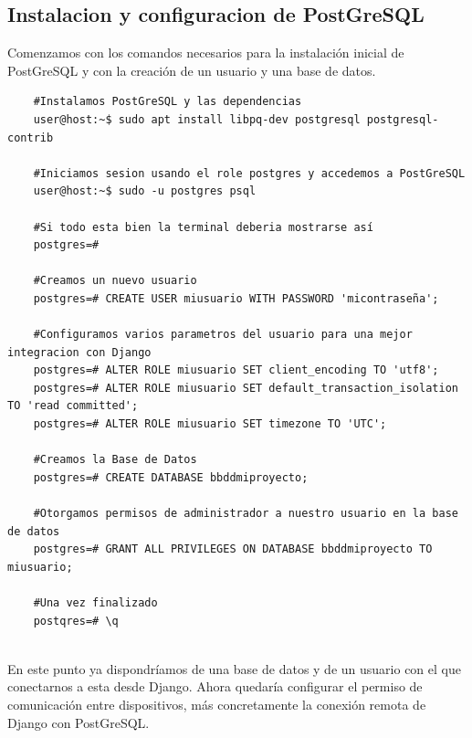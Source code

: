 \subsection{Instalacion y configuracion de PostGreSQL}
Comenzamos con los comandos necesarios para la instalación inicial de PostGreSQL y con la creación de un usuario y una base de datos.
\begin{verbatim}
	#Instalamos PostGreSQL y las dependencias
	user@host:~$ sudo apt install libpq-dev postgresql postgresql-contrib
	
	#Iniciamos sesion usando el role postgres y accedemos a PostGreSQL
	user@host:~$ sudo -u postgres psql
	
	#Si todo esta bien la terminal deberia mostrarse así
	postgres=# 
	
	#Creamos un nuevo usuario
	postgres=# CREATE USER miusuario WITH PASSWORD 'micontraseña';
	
	#Configuramos varios parametros del usuario para una mejor integracion con Django
	postgres=# ALTER ROLE miusuario SET client_encoding TO 'utf8';
	postgres=# ALTER ROLE miusuario SET default_transaction_isolation TO 'read committed';
	postgres=# ALTER ROLE miusuario SET timezone TO 'UTC';
	
	#Creamos la Base de Datos
	postgres=# CREATE DATABASE bbddmiproyecto;
	
	#Otorgamos permisos de administrador a nuestro usuario en la base de datos
	postgres=# GRANT ALL PRIVILEGES ON DATABASE bbddmiproyecto TO miusuario;
	
	#Una vez finalizado
	postqres=# \q
	
\end{verbatim}

En este punto ya dispondríamos de una base de datos y de un usuario con el que conectarnos a esta desde Django.
\newline
Ahora quedaría configurar el permiso de comunicación entre dispositivos, más concretamente la conexión remota de Django con PostGreSQL.

